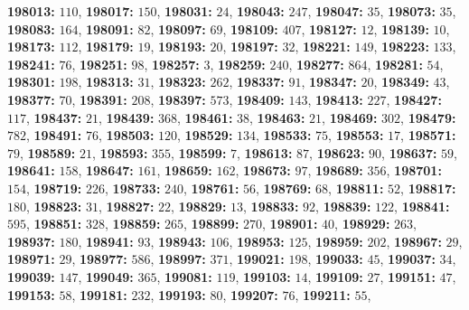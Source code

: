 \textsf{\bfseries 198013:} $110$, \textsf{\bfseries 198017:} $150$, \textsf{\bfseries 198031:} $24$, \textsf{\bfseries 198043:} $247$, \textsf{\bfseries 198047:} $35$, \textsf{\bfseries 198073:} $35$, \textsf{\bfseries 198083:} $164$, \textsf{\bfseries 198091:} $82$, \textsf{\bfseries 198097:} $69$, \textsf{\bfseries 198109:} $407$, \textsf{\bfseries 198127:} $12$, \textsf{\bfseries 198139:} $10$, \textsf{\bfseries 198173:} $112$, \textsf{\bfseries 198179:} $19$, \textsf{\bfseries 198193:} $20$, \textsf{\bfseries 198197:} $32$, \textsf{\bfseries 198221:} $149$, \textsf{\bfseries 198223:} $133$, \textsf{\bfseries 198241:} $76$, \textsf{\bfseries 198251:} $98$, \textsf{\bfseries 198257:} $3$, \textsf{\bfseries 198259:} $240$, \textsf{\bfseries 198277:} $864$, \textsf{\bfseries 198281:} $54$, \textsf{\bfseries 198301:} $198$, \textsf{\bfseries 198313:} $31$, \textsf{\bfseries 198323:} $262$, \textsf{\bfseries 198337:} $91$, \textsf{\bfseries 198347:} $20$, \textsf{\bfseries 198349:} $43$, \textsf{\bfseries 198377:} $70$, \textsf{\bfseries 198391:} $208$, \textsf{\bfseries 198397:} $573$, \textsf{\bfseries 198409:} $143$, \textsf{\bfseries 198413:} $227$, \textsf{\bfseries 198427:} $117$, \textsf{\bfseries 198437:} $21$, \textsf{\bfseries 198439:} $368$, \textsf{\bfseries 198461:} $38$, \textsf{\bfseries 198463:} $21$, \textsf{\bfseries 198469:} $302$, \textsf{\bfseries 198479:} $782$, \textsf{\bfseries 198491:} $76$, \textsf{\bfseries 198503:} $120$, \textsf{\bfseries 198529:} $134$, \textsf{\bfseries 198533:} $75$, \textsf{\bfseries 198553:} $17$, \textsf{\bfseries 198571:} $79$, \textsf{\bfseries 198589:} $21$, \textsf{\bfseries 198593:} $355$, \textsf{\bfseries 198599:} $7$, \textsf{\bfseries 198613:} $87$, \textsf{\bfseries 198623:} $90$, \textsf{\bfseries 198637:} $59$, \textsf{\bfseries 198641:} $158$, \textsf{\bfseries 198647:} $161$, \textsf{\bfseries 198659:} $162$, \textsf{\bfseries 198673:} $97$, \textsf{\bfseries 198689:} $356$, \textsf{\bfseries 198701:} $154$, \textsf{\bfseries 198719:} $226$, \textsf{\bfseries 198733:} $240$, \textsf{\bfseries 198761:} $56$, \textsf{\bfseries 198769:} $68$, \textsf{\bfseries 198811:} $52$, \textsf{\bfseries 198817:} $180$, \textsf{\bfseries 198823:} $31$, \textsf{\bfseries 198827:} $22$, \textsf{\bfseries 198829:} $13$, \textsf{\bfseries 198833:} $92$, \textsf{\bfseries 198839:} $122$, \textsf{\bfseries 198841:} $595$, \textsf{\bfseries 198851:} $328$, \textsf{\bfseries 198859:} $265$, \textsf{\bfseries 198899:} $270$, \textsf{\bfseries 198901:} $40$, \textsf{\bfseries 198929:} $263$, \textsf{\bfseries 198937:} $180$, \textsf{\bfseries 198941:} $93$, \textsf{\bfseries 198943:} $106$, \textsf{\bfseries 198953:} $125$, \textsf{\bfseries 198959:} $202$, \textsf{\bfseries 198967:} $29$, \textsf{\bfseries 198971:} $29$, \textsf{\bfseries 198977:} $586$, \textsf{\bfseries 198997:} $371$, \textsf{\bfseries 199021:} $198$, \textsf{\bfseries 199033:} $45$, \textsf{\bfseries 199037:} $34$, \textsf{\bfseries 199039:} $147$, \textsf{\bfseries 199049:} $365$, \textsf{\bfseries 199081:} $119$, \textsf{\bfseries 199103:} $14$, \textsf{\bfseries 199109:} $27$, \textsf{\bfseries 199151:} $47$, \textsf{\bfseries 199153:} $58$, \textsf{\bfseries 199181:} $232$, \textsf{\bfseries 199193:} $80$, \textsf{\bfseries 199207:} $76$, \textsf{\bfseries 199211:} $55$, 
